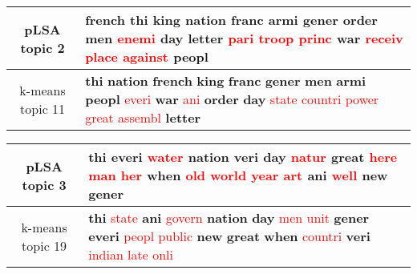 \begin{center}\begin{tabularx}{\textwidth} {
  | c | >{\raggedright\arraybackslash}X | } \hline 
pLSA topic 2 & \textbf{french} \textbf{thi} \textbf{king} \textbf{nation} \textbf{franc} \textbf{armi} \textbf{gener} \textbf{order} \textbf{men} \textcolor{red}{enemi} \textbf{day} \textbf{letter} \textcolor{red}{pari} \textcolor{red}{troop} \textcolor{red}{princ} \textbf{war} \textcolor{red}{receiv} \textcolor{red}{place} \textcolor{red}{against} \textbf{peopl} \\ \hline 
k-means topic 11 & \textbf{thi} \textbf{nation} \textbf{french} \textbf{king} \textbf{franc} \textbf{gener} \textbf{men} \textbf{armi} \textbf{peopl} \textcolor{red}{everi} \textbf{war} \textcolor{red}{ani} \textbf{order} \textbf{day} \textcolor{red}{state} \textcolor{red}{countri} \textcolor{red}{power} \textcolor{red}{great} \textcolor{red}{assembl} \textbf{letter} \\ \hline 
\end{tabularx}

\end{center}

\begin{center}\begin{tabularx}{\textwidth} {
  | c | >{\raggedright\arraybackslash}X | } \hline 
pLSA topic 3 & \textbf{thi} \textbf{everi} \textcolor{red}{water} \textbf{nation} \textbf{veri} \textbf{day} \textcolor{red}{natur} \textbf{great} \textcolor{red}{here} \textcolor{red}{man} \textcolor{red}{her} \textbf{when} \textcolor{red}{old} \textcolor{red}{world} \textcolor{red}{year} \textcolor{red}{art} \textbf{ani} \textcolor{red}{well} \textbf{new} \textbf{gener} \\ \hline 
k-means topic 19 & \textbf{thi} \textcolor{red}{state} \textbf{ani} \textcolor{red}{govern} \textbf{nation} \textbf{day} \textcolor{red}{men} \textcolor{red}{unit} \textbf{gener} \textbf{everi} \textcolor{red}{peopl} \textcolor{red}{public} \textbf{new} \textbf{great} \textbf{when} \textcolor{red}{countri} \textbf{veri} \textcolor{red}{indian} \textcolor{red}{late} \textcolor{red}{onli} \\ \hline 
\end{tabularx}

\end{center}

